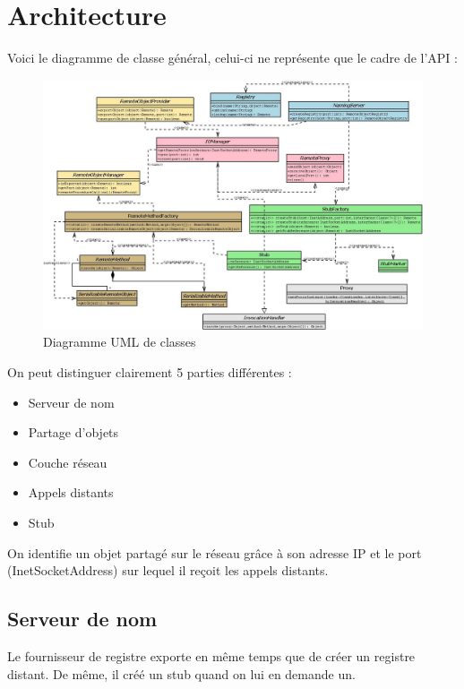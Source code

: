 \chapter{Architecture}

\hspace{-.6cm}Voici le diagramme de classe général, celui-ci ne représente que le cadre de l'API :
\begin{figure}[H]
\begin{center}
\includegraphics[scale=0.42,angle=90]{img/diag_classes.jpeg}
\caption{Diagramme UML de classes}
\end{center}
\end{figure}
\medskip
\hspace{-.6cm}On peut distinguer clairement 5 parties différentes :
\begin{itemize}
\item Serveur de nom
\item Partage d'objets
\item Couche réseau
\item Appels distants
\item Stub
\end{itemize}
\medskip

On identifie un objet partagé sur le réseau grâce à son adresse IP et le port (InetSocketAddress) sur lequel il reçoit les appels distants.

\section{Serveur de nom}
\hspace{-.6cm}Le fournisseur de registre exporte en même temps que de créer un registre distant. De même, il créé un stub quand on lui en demande un.

